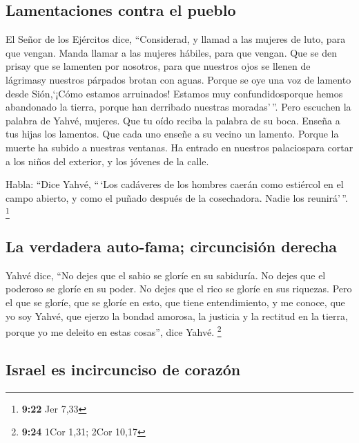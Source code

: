 \begin{paracol}{2}
\hypertarget{lamentaciones-contra-el-pueblo}{%
\subsection{Lamentaciones contra el
pueblo}\label{lamentaciones-contra-el-pueblo}}

 El Señor de los Ejércitos dice, ``Considerad, y llamad a
las mujeres de luto, para que vengan. Manda llamar a las mujeres
hábiles, para que vengan.  Que se den prisay que se
lamenten por nosotros, para que nuestros ojos se llenen de lágrimasy
nuestros párpados brotan con aguas.  Porque se oye una
voz de lamento desde Sión,`¡Cómo estamos arruinados! Estamos muy
confundidosporque hemos abandonado la tierra, porque han derribado
nuestras moradas'\,''.  Pero escuchen la palabra de
Yahvé, mujeres. Que tu oído reciba la palabra de su boca. Enseña a tus
hijas los lamentos. Que cada uno enseñe a su vecino un lamento.
 Porque la muerte ha subido a nuestras ventanas. Ha
entrado en nuestros palaciospara cortar a los niños del exterior, y los
jóvenes de la calle.

 Habla: ``Dice Yahvé, ``\,`Los cadáveres de los hombres
caerán como estiércol en el campo abierto, y como el puñado después de
la cosechadora. Nadie los reunirá'\,''. \footnote{\textbf{9:22} Jer 7,33}

\hypertarget{la-verdadera-auto-fama-circuncisiuxf3n-derecha}{%
\subsection{La verdadera auto-fama; circuncisión
derecha}\label{la-verdadera-auto-fama-circuncisiuxf3n-derecha}}

 Yahvé dice, ``No dejes que el sabio se gloríe en su
sabiduría. No dejes que el poderoso se gloríe en su poder. No dejes que
el rico se gloríe en sus riquezas.  Pero el que se
gloríe, que se gloríe en esto, que tiene entendimiento, y me conoce, que
yo soy Yahvé, que ejerzo la bondad amorosa, la justicia y la rectitud en
la tierra, porque yo me deleito en estas cosas'', dice Yahvé.
\footnote{\textbf{9:24} 1Cor 1,31; 2Cor 10,17}

\hypertarget{israel-es-incircunciso-de-corazuxf3n}{%
\subsection{Israel es incircunciso de
corazón}\label{israel-es-incircunciso-de-corazuxf3n}}


\end{paracol}
